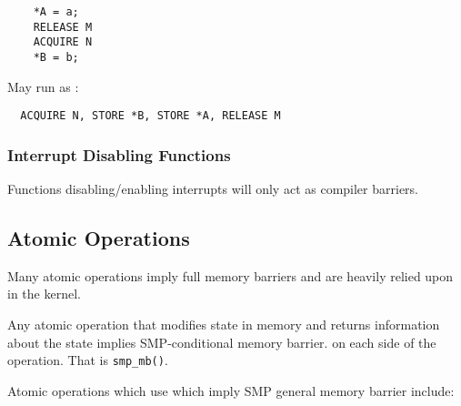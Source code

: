 \documentclass{article}
\begin{document}
\begin{lstlisting}  
	*A = a;
	RELEASE M
	ACQUIRE N
	*B = b;
\end{lstlisting}

May run as :


\begin{lstlisting}
  ACQUIRE N, STORE *B, STORE *A, RELEASE M
\end{lstlisting}



\subsubsection{Interrupt Disabling Functions}
Functions disabling/enabling interrupts will only act as compiler
barriers. 


\subsection{Atomic Operations}

Many atomic operations imply full memory barriers and are heavily
relied upon in the kernel.

Any atomic operation that modifies state in memory and returns
information about the state implies SMP-conditional memory barrier.
on each side of the operation. That is \lstinline{smp_mb()}.

Atomic operations which use which imply SMP general memory barrier
include:
\end{document}

